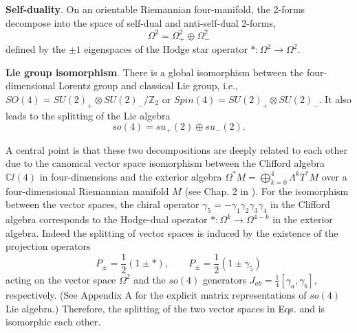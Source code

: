 \documentclass[12pt,epsf]{article}
\begin{document}
{\bf Self-duality}. On an orientable Riemannian four-manifold, the 2-forms decompose into the space of self-dual
and anti-self-dual 2-forms,
\begin{equation}\label{sd-asd}
  \Omega^2 = \Omega_+^2 \oplus \Omega_-^2
\end{equation}
defined by the $\pm 1$ eigenspaces of the Hodge star operator $*:  \Omega^2 \to \Omega^2$.


{\bf Lie group isomorphism}. There is a global isomorphism between the four-dimensional Lorentz group
and classical Lie group, i.e., $SO(4)= SU(2)_+ \otimes SU(2)_-/\mathbb{Z}_2$ or $Spin(4)= SU(2)_+ \otimes SU(2)_-$.
It also leads to the splitting of the Lie algebra
\begin{equation}\label{lie-iso}
  so(4) = su_+(2) \oplus su_-(2).
\end{equation}




A central point is that these two decompositions are deeply related to each other due to the canonical vector space
isomorphism between the Clifford algebra $\mathbb{C}l(4)$ in four-dimensions and the exterior algebra
$\Omega^* M = \bigoplus_{k=0}^4 \Lambda^k T^* M$ over a four-dimensional Riemannian manifold $M$ (see Chap. 2 in \cite{book-clifford}).
For the isomorphism between the vector spaces, the chiral operator $\gamma_5 = - \gamma_1 \gamma_2 \gamma_3 \gamma_4$
in the Clifford algebra corresponds to the Hodge-dual operator $*: \Omega^k \to \Omega^{4-k}$ in the exterior algebra.
Indeed the splitting of vector spaces is induced by the existence of the projection operators
\begin{equation}\label{proj-op2}
  P_\pm = \frac{1}{2} (1 \pm *), \qquad P_\pm = \frac{1}{2} (1 \pm \gamma_5)
\end{equation}
acting on the vector space $\Omega^2$ and the $so(4)$ generators $J_{ab} = \frac{1}{4} [\gamma_a, \gamma_b]$, respectively.
(See Appendix A for the explicit matrix representations of $so(4)$ Lie algebra.)
Therefore, the splitting of the two vector spaces in Eqs.  and  is isomorphic each other.
\end{document}
